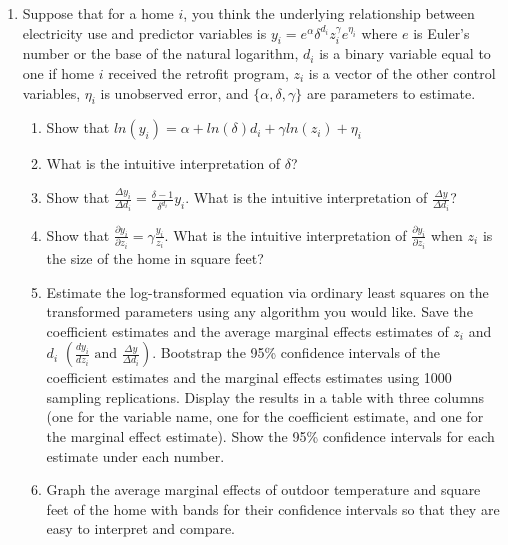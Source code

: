 \documentclass{article}
\begin{document}
\begin{enumerate}
    \item Suppose that for a home $i$, you think the underlying relationship between electricity use and predictor variables is $y_i = e^{\alpha} \delta^{d_i} z_i^{\gamma}  e^{\eta_i} $ where $e$ is Euler's number or the base of the natural logarithm, $d_i$ is a binary variable equal to one if home $i$ received the retrofit program, $z_i$ is a vector of the other control variables, $\eta_i$ is unobserved error, and  $\lbrace \alpha,\delta,\gamma \rbrace$ are parameters to estimate.
    \begin{enumerate}[label=(\alph*)]
        \item Show that $ln(y_i) = \alpha + ln(\delta) d_i + \gamma ln(z_i) + \eta_i$
        \item What is the intuitive interpretation of $\delta$?
        \item Show that $\frac{\Delta y_i}{\Delta d_i} = \frac{\delta - 1}{\delta^{d_i}}y_i$.  What is the intuitive interpretation of $\frac{\Delta y}{\Delta d_i}$?
        \item Show that $\frac{\partial y_i}{\partial z_i} = \gamma \frac{y_i}{z_i}$.  What is the intuitive interpretation of $\frac{\partial y_i}{\partial z_i}$ when $z_i$ is the size of the home in square feet?
        \item Estimate the log-transformed equation via ordinary least squares on the transformed parameters using any algorithm you would like. Save the coefficient estimates and the average marginal effects estimates of $z_i$ and $d_i$ $\left( \frac{d y_i}{d z_i} \text{ and } \frac{\Delta y}{\Delta d_i}\right)$. Bootstrap the 95\% confidence intervals of the coefficient estimates and the marginal effects estimates using 1000 sampling replications.  Display the results in a table with three columns (one for the variable name, one for the coefficient estimate, and one for the marginal effect estimate).  Show the 95\% confidence intervals for each estimate under each number.
        \item Graph the average marginal effects of outdoor temperature and square feet of the home with bands for their confidence intervals so that they are easy to interpret and compare.
        \end{enumerate}
\end{enumerate}
\end{document}

